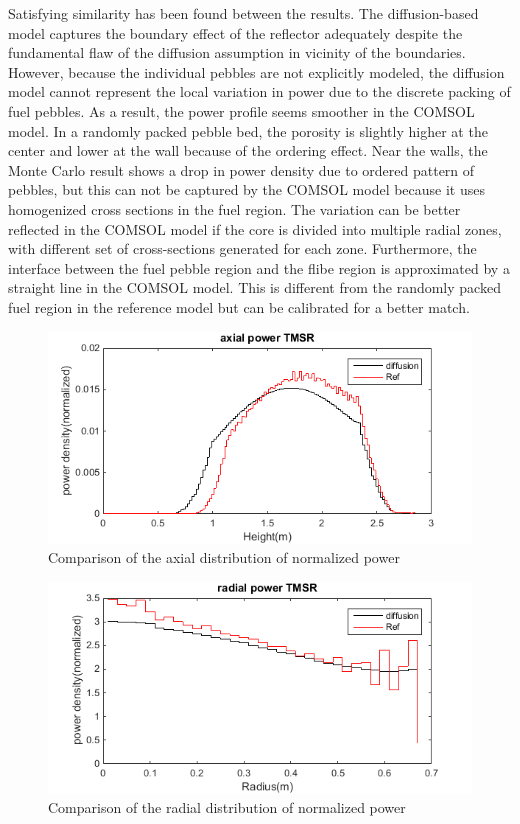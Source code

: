 \documentclass{elsarticle}
\begin{document}
Satisfying similarity has been found between the results. The diffusion-based model captures the boundary effect of the reflector adequately despite the fundamental flaw of the diffusion assumption in vicinity of the boundaries. However, because the individual pebbles are not explicitly modeled, the diffusion model cannot represent the local variation in power due to the discrete packing of fuel pebbles. As a result, the power profile seems smoother in the COMSOL model. 
In a randomly packed pebble bed, the porosity is slightly higher at the center and lower at the wall because of the ordering effect. Near the walls, the Monte Carlo result shows a drop in power density due to ordered pattern of pebbles, but this can not be captured by the COMSOL model because it uses homogenized cross sections in the fuel region. The variation can be better reflected in the COMSOL model if the core is divided into multiple radial zones, with different set of cross-sections generated for each zone.
Furthermore, the interface between the fuel pebble region and the flibe region is approximated by a straight line in the COMSOL model. This is different from the randomly packed fuel region in the reference model but can be calibrated for a better match. 



\begin{figure}
  \centering
  \includegraphics[width=0.7\columnwidth]{./images/benchmark/axial_TMSR.png}
  \caption{Comparison of the axial distribution of normalized power}
  \label{fig:axial_power}
\end{figure}

\begin{figure}
  \centering
  \includegraphics[width=0.7\columnwidth]{./images/benchmark/radial_TMSR.png}
  \caption{Comparison of the radial distribution of normalized power}
  \label{fig:radial_power}
\end{figure}
\end{document}
